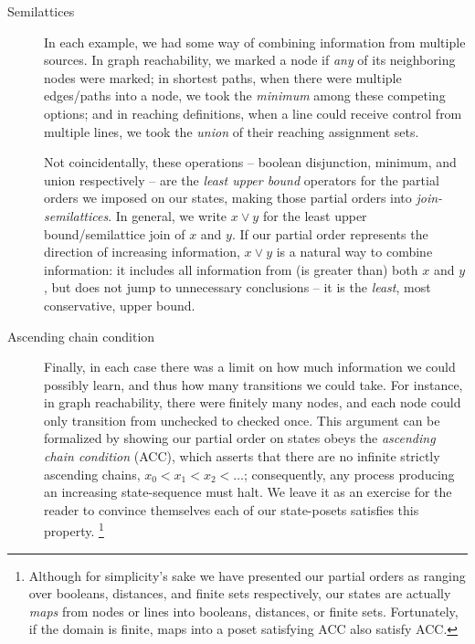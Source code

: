 \begin{description}
\item[Semilattices] In each example, we had some way of combining information
  from multiple sources. In graph reachability, we marked a node if \emph{any}
  of its neighboring nodes were marked; in shortest paths, when there were
  multiple edges/paths into a node, we took the \emph{minimum} among these
  competing options; and in reaching definitions, when a line could receive
  control from multiple lines, we took the \emph{union} of their reaching
  assignment sets.

  Not coincidentally, these operations -- boolean disjunction, minimum, and
  union respectively -- are the \emph{least upper bound} operators for the
  partial orders we imposed on our states, making those partial orders into
  \emph{join-semilattices}.
%
  In general, we write $x \vee y$ for the least upper bound/semilattice join of
  $x$ and $y$. If our partial order represents the direction of increasing
  information, $x \vee y$ is a natural way to combine information: it includes
  all information from (is greater than) both $x$ and $y$, but does not jump to
  unnecessary conclusions -- it is the \emph{least}, most conservative, upper
  bound.

\item[Ascending chain condition] Finally, in each case there was a limit on how
  much information we could possibly learn, and thus how many transitions we
  could take. For instance, in graph reachability, there were finitely many
  nodes, and each node could only transition from unchecked to checked once.
%
  This argument can be formalized by showing our partial order on states obeys
  the \emph{ascending chain condition} (ACC), which asserts that there are no
  infinite strictly ascending chains, $x_0 < x_1 < x_2 < \dots$; consequently,
  any process producing an increasing state-sequence must halt.
%
  We leave it as an exercise for the reader to convince themselves each of our
  state-posets satisfies this property.%
%
  \footnote{Although for simplicity's sake we have presented our partial orders
    as ranging over booleans, distances, and finite sets respectively, our
    states are actually \emph{maps} from nodes or lines into booleans,
    distances, or finite sets. Fortunately, if the domain is finite, maps into a
    poset satisfying ACC also satisfy ACC.}
\end{description}

